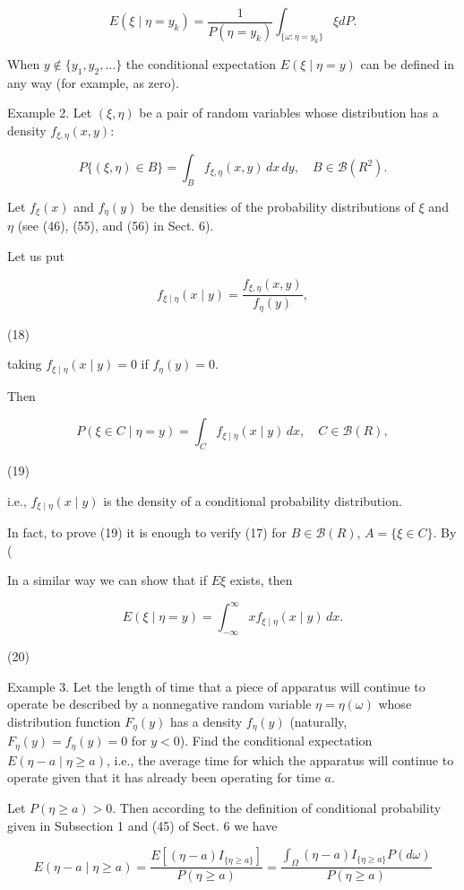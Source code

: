 $$E(\xi \mid \eta = y_k) = \frac{1}{P(\eta = y_k)} \int_{\{\omega : \eta = y_k\}} \xi dP.$$

When $y \notin \{y_1, y_2, \ldots\}$ the conditional expectation $E(\xi \mid \eta = y)$ can be defined in any way (for example, as zero).

Example 2. Let $(\xi, \eta)$ be a pair of random variables whose distribution has a density $f_{\xi, \eta}(x, y)$:

$$P\{(\xi, \eta) \in B\} = \int_B f_{\xi, \eta}(x, y) \, dx \, dy, \quad B \in \mathcal{B}(R^2).$$

Let $f_{\xi}(x)$ and $f_{\eta}(y)$ be the densities of the probability distributions of $\xi$ and $\eta$ (see (46), (55), and (56) in Sect. 6).

Let us put

$$f_{\xi \mid \eta}(x \mid y) = \frac{f_{\xi, \eta}(x, y)}{f_{\eta}(y)},$$

(18)

taking $f_{\xi \mid \eta}(x \mid y) = 0$ if $f_{\eta}(y) = 0$.

Then

$$P(\xi \in C \mid \eta = y) = \int_C f_{\xi \mid \eta}(x \mid y) \, dx, \quad C \in \mathcal{B}(R),$$

(19)

i.e., $f_{\xi \mid \eta}(x \mid y)$ is the density of a conditional probability distribution.

In fact, to prove (19) it is enough to verify (17) for $B \in \mathcal{B}(R)$, $A = \{\xi \in C\}$. By (

In a similar way we can show that if $E \xi$ exists, then

$$E(\xi \mid \eta = y) = \int_{-\infty}^{\infty} xf_{\xi \mid \eta}(x \mid y) \, dx.$$  

(20)

Example 3. Let the length of time that a piece of apparatus will continue to operate be described by a nonnegative random variable $\eta = \eta(\omega)$ whose distribution function $F_{\eta}(y)$ has a density $f_{\eta}(y)$ (naturally, $F_{\eta}(y) = f_{\eta}(y) = 0$ for $y < 0$). Find the conditional expectation $E(\eta - a \mid \eta \geq a)$, i.e., the average time for which the apparatus will continue to operate given that it has already been operating for time $a$.

Let $P(\eta \geq a) > 0$. Then according to the definition of conditional probability given in Subsection 1 and (45) of Sect. 6 we have

$$E(\eta - a \mid \eta \geq a) = \frac{E[(\eta - a)I_{\{\eta \geq a\}}]}{P(\eta \geq a)} = \frac{\int_{\Omega}(\eta - a)I_{\{\eta \geq a\}} P(d\omega)}{P(\eta \geq a)}$$

